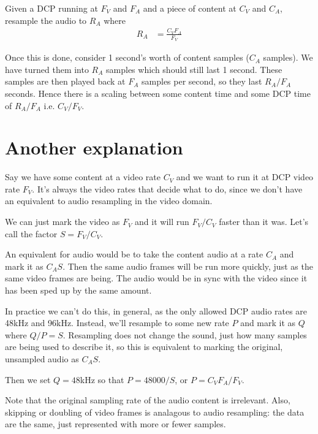 \documentclass{article}
\begin{document}
Given a DCP running at $F_V$ and $F_A$ and a piece of content at $C_V$
and $C_A$, resample the audio to $R_A$ where
\begin{align*}
R_A &= \frac{C_V F_A}{F_V}
\end{align*}

Once this is done, consider 1 second's worth of content samples ($C_A$
samples).  We have turned them into $R_A$ samples which should still
last 1 second.  These samples are then played back at $F_A$ samples
per second, so they last $R_A / F_A$ seconds.  Hence there is a
scaling between some content time and some DCP time of $R_A / F_A$
i.e. $C_V / F_V$.


\section{Another explanation}

Say we have some content at a video rate $C_V$ and we want to
run it at DCP video rate $F_V$.  It's always the video rates that
decide what to do, since we don't have an equivalent to audio
resampling in the video domain.

We can just mark the video as $F_V$ and it will run $F_V / C_V$ faster
than it was.  Let's call the factor $S = F_V / C_V$.

An equivalent for audio would be to take the content audio at a rate
$C_A$ and mark it as $C_A S$.  Then the same audio frames will be run
more quickly, just as the same video frames are being.  The audio would be
in sync with the video since it has been sped up by the same amount.

In practice we can't do this, in general, as the only allowed DCP
audio rates are 48kHz and 96kHz.  Instead, we'll resample to some new
rate $P$ and mark it as $Q$ where $Q / P = S$.  Resampling does not
change the sound, just how many samples are being used to describe it,
so this is equivalent to marking the original, unsampled audio as $C_A S$.

Then we set $Q = 48$kHz so that $P = 48000 / S$, or $P = C_V F_A
/ F_V$.

Note that the original sampling rate of the audio content is
irrelevant.  Also, skipping or doubling of video frames is analagous
to audio resampling: the data are the same, just represented with more
or fewer samples.
\end{document}
